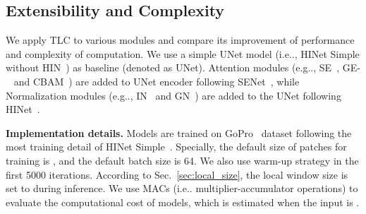 \documentclass[runningheads]{llncs}
\makeatletter
\DeclareRobustCommand\onedot{\futurelet\@let@token\@onedot}
\def\@onedot{\ifx\@let@token.\else.\null\fi\xspace}
\def\eg{e.g\onedot}
\def\ie{i.e\onedot}
\makeatother
\begin{document}
\subsection{Extensibility and Complexity} \label{sec:ext_unet}
\begin{table}[t]
\centering
\caption{
The results of applying TLC to different modules on GoPro dataset. TLC improves the performance of all models with negligible costs
}
\label{tab:Unet_local}
\end{table} We apply TLC to various modules and compare its improvement of performance and complexity of computation.
We use a simple UNet model (\ie, HINet Simple without HIN~\cite{chen2021hinet}) as baseline (denoted as UNet).
Attention modules (\eg, SE~\cite{hu2018squeeze}, GE-~\cite{hu2018gather} and CBAM~\cite{woo2018cbam}) are added to UNet encoder following SENet~\cite{hu2018squeeze}, while Normalization modules (\eg, IN~\cite{ulyanov2016instance} and GN~\cite{wu2018group}) are added to the UNet following HINet~\cite{chen2021hinet}. 

\textbf{Implementation details.}
Models are trained on GoPro~\cite{nah2017deep} dataset following the most training detail of HINet Simple~\cite{chen2021hinet}. 
Specially, the default size of patches for training is , and the default batch size is 64. We also use warm-up strategy in the first 5000 iterations. According to Sec.~\ref{sec:local_size}, the local window size is set to  during inference.
We use MACs (\ie multiplier-accumulator operations) to evaluate the computational cost of models, which is estimated when the input is . 
\end{document}
